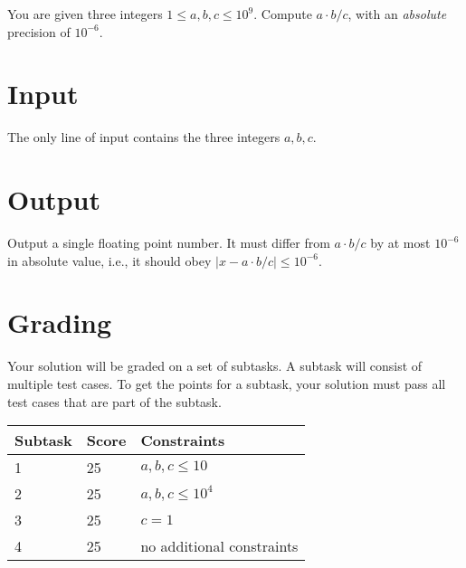
You are given three integers $1 \le a, b, c \le 10^9$. Compute $a \cdot b / c$, with an \emph{absolute} precision of $10^{-6}$.

\section*{Input}
The only line of input contains the three integers $a, b, c$.

\section*{Output}
Output a single floating point number. It must differ from $a \cdot b / c$ by at most $10^{-6}$ in absolute value, i.e., it should obey $|x - a \cdot b / c| \le 10^{-6}$.

\section*{Grading}
Your solution will be graded on a set of subtasks.
A subtask will consist of multiple test cases.
To get the points for a subtask, your solution must pass all test cases that are part of the subtask.

\noindent
\begin{tabular}{| l | l | l |}
\hline
Subtask & Score & Constraints \\ \hline
1 & 25 & $a, b, c \leq 10$ \\ \hline
2 & 25 & $a, b, c \leq 10^4$ \\ \hline
3 & 25 & $c = 1$ \\ \hline
4 & 25 & no additional constraints \\ \hline
\end{tabular}
